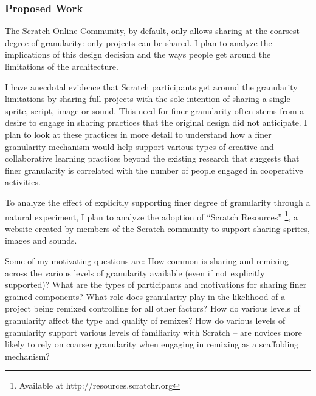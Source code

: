 \subsubsection{Proposed Work}
The Scratch Online Community, by default, only allows sharing at the coarsest degree of granularity: only projects can be shared. 
I plan to analyze the implications of this design decision and the ways  people get around the limitations of the architecture.

I have anecdotal evidence that Scratch participants get around the granularity limitations by sharing full projects with the sole intention of sharing a single sprite, script, image or sound.
This need for finer granularity often stems from a desire to engage in sharing practices that the original design did not anticipate. 
I plan to look at these practices in more detail to understand how a finer granularity mechanism would help support various types of creative and collaborative learning practices beyond the existing research that suggests that finer granularity is correlated with the number of people engaged in cooperative activities.

To analyze the effect of explicitly supporting finer degree of granularity through a natural experiment, I plan to analyze the adoption of ``Scratch Resources'' \footnote{Available at http://resources.scratchr.org}, a website created by members of the Scratch community to support sharing sprites, images and sounds. 

Some of my motivating questions are: 
How common is sharing and remixing across the various levels of granularity available (even if not explicitly supported)?
What are the types of participants and motivations for sharing finer grained components?
What role does granularity play in the likelihood of a project being remixed controlling for all other factors?
How do various levels of granularity affect the type and quality of remixes?
How do various levels of granularity support various levels of familiarity with Scratch -- are novices more likely to rely on coarser granularity when engaging in remixing as a scaffolding mechanism?

